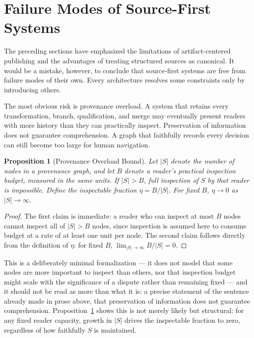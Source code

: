 \documentclass[11pt]{article}
\newtheorem{proposition}[theorem]{Proposition}
\theoremstyle{definition}
\begin{document}
\section{Failure Modes of Source-First Systems}
\label{sec:failure-modes}

The preceding sections have emphasized the limitations of artifact-centered publishing and the advantages of treating structured sources as canonical. It would be a mistake, however, to conclude that source-first systems are free from failure modes of their own. Every architecture resolves some constraints only by introducing others.

The most obvious risk is provenance overload. A system that retains every transformation, branch, qualification, and merge may eventually present readers with more history than they can practically inspect. Preservation of information does not guarantee comprehension. A graph that faithfully records every decision can still become too large for human navigation.

\begin{proposition}[Provenance Overload Bound]
\label{prop:overload-bound}
Let $|S|$ denote the number of nodes in a provenance graph, and let $B$ denote a reader's practical inspection budget, measured in the same units. If $|S| > B$, full inspection of $S$ by that reader is impossible. Define the \emph{inspectable fraction} $\eta = B / |S|$. For fixed $B$, $\eta \to 0$ as $|S| \to \infty$.
\end{proposition}

\begin{proof}
The first claim is immediate: a reader who can inspect at most $B$ nodes cannot inspect all of $|S| > B$ nodes, since inspection is assumed here to consume budget at a rate of at least one unit per node. The second claim follows directly from the definition of $\eta$: for fixed $B$, $\lim_{|S|\to\infty} B/|S| = 0$.
\end{proof}

This is a deliberately minimal formalization --- it does not model that some nodes are more important to inspect than others, nor that inspection budget might scale with the significance of a dispute rather than remaining fixed --- and it should not be read as more than what it is: a precise statement of the sentence already made in prose above, that preservation of information does not guarantee comprehension. Proposition~\ref{prop:overload-bound} shows this is not merely likely but structural: for any fixed reader capacity, growth in $|S|$ drives the inspectable fraction to zero, regardless of how faithfully $S$ is maintained.
\end{document}
